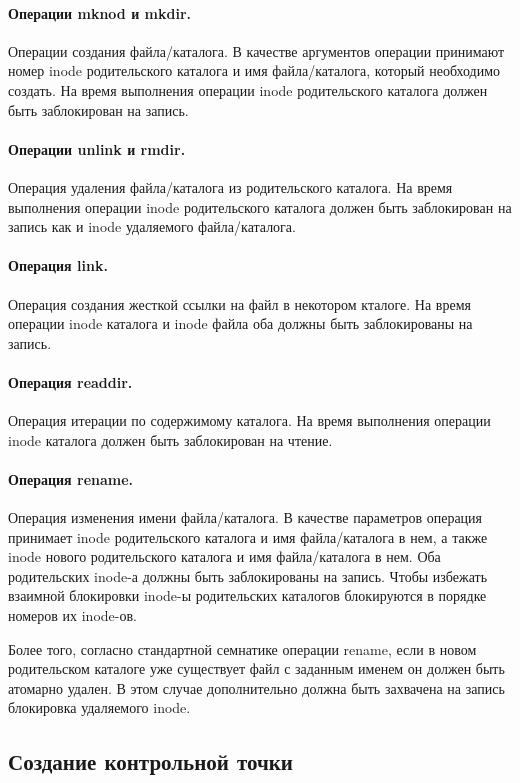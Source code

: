 \paragraph{Операции mknod и mkdir.} Операции создания файла/каталога. В качестве
аргументов операции принимают номер inode родительского каталога и имя
файла/каталога, который необходимо создать. На время выполнения операции inode
родительского каталога должен быть заблокирован на запись.

\paragraph{Операции unlink и rmdir.} Операция удаления файла/каталога из
родительского каталога. На время выполнения операции inode родительского
каталога должен быть заблокирован на запись как и inode удаляемого
файла/каталога.

\paragraph{Операция link.} Операция создания жесткой ссылки на файл в некотором
кталоге. На время операции inode каталога и inode файла оба должны быть
заблокированы на запись.

\paragraph{Операция readdir.} Операция итерации по содержимому каталога. На
время выполнения операции inode каталога должен быть заблокирован на чтение.

\paragraph{Операция rename.} Операция изменения имени файла/каталога. В качестве
параметров операция принимает inode родительского каталога и имя файла/каталога
в нем, а также inode нового родительского каталога и имя файла/каталога в нем.
Оба родительских inode-а должны быть заблокированы на запись. Чтобы избежать
взаимной блокировки inode-ы родительских каталогов блокируются в порядке номеров
их inode-ов.

Более того, согласно стандартной семнатике операции rename, если в новом
родительском каталоге уже существует файл с заданным именем он должен быть
атомарно удален. В этом случае дополнительно должна быть захвачена на запись
блокировка удаляемого inode.


\subsection{Создание контрольной точки}
\label{sec:commit}

